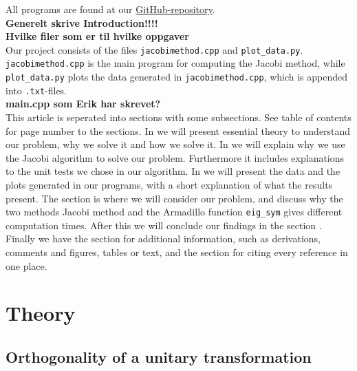 \documentclass{article}
\begin{document}
All programs are found at our \href{https://github.com/Erikbgram/Fys3150}{GitHub-repository}. \\


\textbf{Generelt skrive Introduction!!!!} \\



\textbf{Hvilke filer som er til hvilke oppgaver} \\

Our project consists of the files \texttt{jacobimethod.cpp} and \texttt{plot\_data.py}. \texttt{jacobimethod.cpp} is the main program for computing the Jacobi method, while \texttt{plot\_data.py} plots the data generated in \texttt{jacobimethod.cpp}, which is appended into \texttt{.txt}-files. \\

\textbf{main.cpp som Erik har skrevet?} \\

This article is seperated into sections with some subsections. See table of contents for page number to the sections. In  we will present essential theory to understand our problem, why we solve it and how we solve it. In  we will explain why we use the Jacobi algorithm to solve our problem. Furthermore it includes explanations to the unit tests we chose in our algorithm.
In  we will present the data and the plots generated in our programs, with a short explanation of what the results present. The section  is where we will consider our problem, and discuss why the two methods Jacobi method and the Armadillo function \texttt{eig\_sym} gives different computation times. After this we will conclude our findings in the section .
Finally we have the section  for additional information, such as derivations, comments and figures, tables or text, and the section  for citing every reference in one place.

\vspace{1cm}

\section{Theory} \label{sec:Theory}

\subsection{Orthogonality of a unitary transformation} \label{sec:orthogonality}
\end{document}
